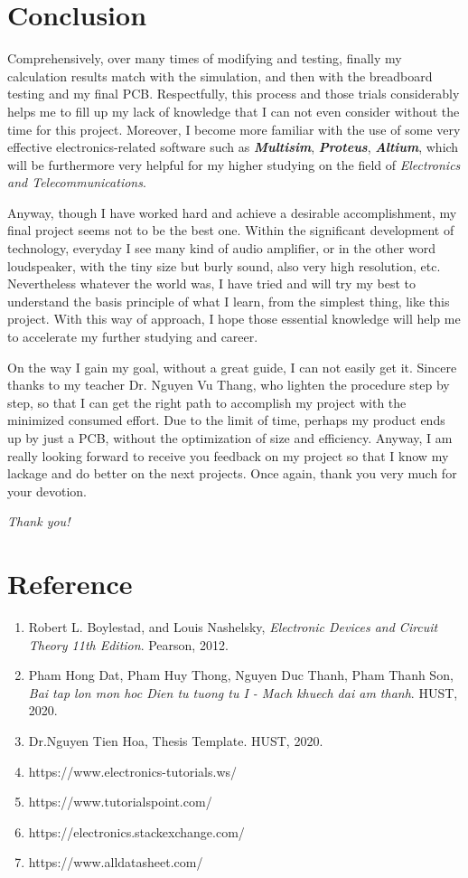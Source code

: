 \documentclass[twoside, a4paper, leqno]{article}
\begin{document}
	\newpage
	\part{Conclusion}
	Comprehensively, over many times of modifying and testing, finally my calculation results match with the simulation, and then with the breadboard testing and my final PCB. Respectfully, this process and those trials considerably helps me to fill up my lack of knowledge that I can not even consider without the time for this project. Moreover, I become more familiar with the use of some very effective electronics-related software such as \textit{\textbf{Multisim}}, \textbf{\textit{Proteus}}, \textbf{\textit{Altium}}, which will be furthermore very helpful for my higher studying on the field of \textit{Electronics and Telecommunications}.
	
	Anyway, though I have worked hard and achieve a desirable accomplishment, my final project seems not to be the best one. Within the significant development of technology, everyday I see many kind of audio amplifier, or in the other word loudspeaker, with the tiny size but burly sound, also very high resolution, etc. Nevertheless whatever the world was, I have tried and will try my best to understand the basis principle of what I learn, from the simplest thing, like this project. With this way of approach, I hope those essential knowledge will help me to accelerate my further studying and career.
	
	On the way I gain my goal, without a great guide, I can not easily get it. Sincere thanks to my teacher Dr. Nguyen Vu Thang, who lighten the procedure step by step, so that I can get the right path to accomplish my project with the minimized consumed effort. Due to the limit of time, perhaps my product ends up by just a PCB, without the optimization of size and efficiency. Anyway, I am really looking forward to receive you feedback on my project so that I know my lackage and do better on the next projects. Once again, thank you very much for your devotion.
	
	\raggedleft \textit{Thank you!}
	
	
	
	
	\newpage
	\part*{Reference}
	\begin{enumerate}
		\item  Robert L. Boylestad, and  Louis Nashelsky, \textit{Electronic Devices and Circuit Theory 11th Edition}. Pearson, 2012.
		\item Pham Hong Dat, Pham Huy Thong, Nguyen Duc Thanh, Pham Thanh  Son, \textit{Bai tap lon mon hoc Dien tu tuong tu I - Mach khuech dai am thanh}. HUST, 2020.
		\item Dr.Nguyen Tien Hoa, Thesis Template. HUST, 2020.
		\item https://www.electronics-tutorials.ws/
		\item https://www.tutorialspoint.com/
		\item https://electronics.stackexchange.com/
		\item https://www.alldatasheet.com/
	\end{enumerate}
	
	
\end{document}
